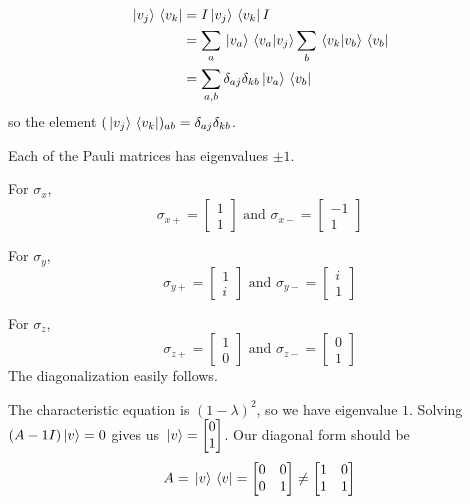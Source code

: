 \exercise
$$
\begin{aligned}
\ket*{v_{j}} \bra*{v_{k}} &= I \ket*{v_{j}} \bra*{v_{k}} I \\
&= \sum_{a} \ket*{v_{a}} \braket*{v_{a}}{v_{j}} \sum_{b} \braket*{v_{k}}{v_{b}} \bra*{v_{b}} \\
&= \sum_{a, b} \delta_{aj} \delta_{kb} \ket*{v_{a}} \bra*{v_{b}}
\end{aligned}
$$
so the element $(\ket*{v_{j}} \bra*{v_{k}})_{ab} = \delta_{aj} \delta_{kb}$. 

\exercise
Each of the Pauli matrices has eigenvalues $\pm 1$. 

For $\sigma_{x}$, 
$$\sigma_{x+} = \begin{bmatrix}
1 \\
1
\end{bmatrix} \text{ and } \sigma_{x-} = \begin{bmatrix}
-1 \\
1
\end{bmatrix}$$

For $\sigma_{y}$, 
$$\sigma_{y+} = \begin{bmatrix}
1 \\
i
\end{bmatrix} \text{ and } \sigma_{y-} = \begin{bmatrix}
i \\
1
\end{bmatrix}$$

For $\sigma_{z}$, 
$$\sigma_{z+} = \begin{bmatrix}
1 \\
0
\end{bmatrix} \text{ and } \sigma_{z-} = \begin{bmatrix}
0 \\
1
\end{bmatrix}$$
The diagonalization easily follows. 

\exercise
The characteristic equation is $(1 - \lambda)^{2}$, so we have eigenvalue $1$. Solving $(A - 1I)\ket*{v} = 0$ gives us $\ket*{v} = \begin{bmatrix}
0 \\
1
\end{bmatrix}$. Our diagonal form should be $$A = \ket*{v} \bra*{v} = \begin{bmatrix}
0 & 0 \\
0 & 1
\end{bmatrix} \neq \begin{bmatrix}
1 & 0 \\ 
1 & 1
\end{bmatrix}$$

